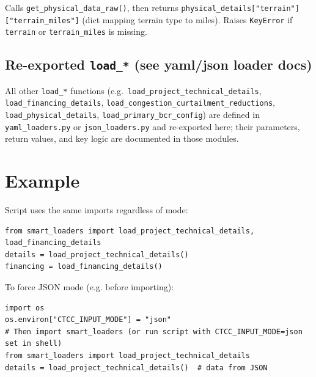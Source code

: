 \documentclass[ctcc_full_documentation.tex]{subfiles}
\begin{document}
Calls \texttt{get\_physical\_data\_raw()}, then returns \texttt{physical\_details["terrain"]["terrain\_miles"]} (dict mapping terrain type to miles). Raises \texttt{KeyError} if \texttt{terrain} or \texttt{terrain\_miles} is missing.

\subsection{Re-exported \texttt{load\_*} (see yaml/json loader docs)}

All other \texttt{load\_*} functions (e.g.\ \texttt{load\_project\_technical\_details}, \texttt{load\_financing\_details}, \texttt{load\_congestion\_curtailment\_reductions}, \texttt{load\_physical\_details}, \texttt{load\_primary\_bcr\_config}) are defined in \texttt{yaml\_loaders.py} or \texttt{json\_loaders.py} and re-exported here; their parameters, return values, and key logic are documented in those modules.

\section{Example}

Script uses the same imports regardless of mode:
\begin{lstlisting}
from smart_loaders import load_project_technical_details, load_financing_details
details = load_project_technical_details()
financing = load_financing_details()
\end{lstlisting}

To force JSON mode (e.g. before importing):
\begin{lstlisting}
import os
os.environ["CTCC_INPUT_MODE"] = "json"
# Then import smart_loaders (or run script with CTCC_INPUT_MODE=json set in shell)
from smart_loaders import load_project_technical_details
details = load_project_technical_details()  # data from JSON
\end{lstlisting}
\end{document}
